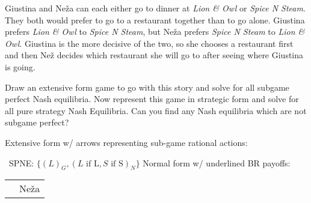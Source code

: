 \documentclass{article}
\begin{document}
\begin{question} 
Giustina and Ne\v{z}a can each either go to dinner at 
  \textit{Lion \& Owl} or \textit{Spice N Steam}.
They both would prefer to go to a restaurant together than to go alone.
Giustina prefers \textit{Lion \& Owl} to \textit{Spice N Steam}, 
  but Ne\v{z}a prefers \textit{Spice N Steam} to \textit{Lion \& Owl}.
Giustina is the more decisive of the two, 
so she chooses a restaurant first
and then Ne\v{z} decides which restaurant she will go to 
after seeing where Giustina is going.
\begin{tasks}
  \task Draw an extensive form game to go with this story 
  and solve for all subgame perfect Nash equilibria. 
  \task 
  Now represent this game in strategic form
  and solve for all pure strategy Nash Equilibria.
  Can you find any Nash equilibria which are not subgame perfect?
\end{tasks}
\begin{solution}
  \begin{tasks}
    \task Extensive form w/ arrows representing sub-game rational actions: \\
    \
  SPNE: 
  $\{(L)_G, (L\text{ if L}, S\text{ if S})_N\}$
  \task Normal form w/ underlined BR payoffs: \\
  \begin{tabular}{*{6}{c|}}
      \multicolumn{2}{c}{} & \multicolumn{4}{c}{Ne\v{z}a} \\ \cline{3-6}

\end{tabular}
\end{tasks}
\end{solution}
\end{question}
\end{document}
